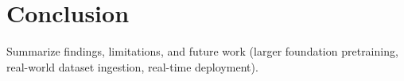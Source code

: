 \section*{Conclusion}

Summarize findings, limitations, and future work (larger foundation pretraining, real-world dataset ingestion, real-time deployment).